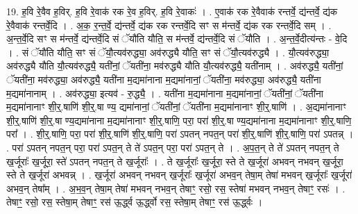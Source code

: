 \documentclass[17pt]{extarticle}
\begin{document}
19. ह॒वि रे॒वैव ह॒विर्. ह॒वि रे॒वाक॑ रक रे॒व ह॒विर्. ह॒वि रे॒वाकः॑ । . ए॒वाक॑ रक रे॒वैवाक॑ रन्तर्वे॒ द्य॑न्तर्वे॒ द्य॑क रे॒वैवाक॑ रन्तर्वे॒दि । . अ॒क॒ र॒न्त॒र्वे॒ द्य॑न्तर्वे॒ द्य॑क रक रन्तर्वे॒दि सꣳ स म॑न्तर्वे॒ द्य॑क रक रन्तर्वे॒दि सम् । . अ॒न्त॒र्वे॒दि सꣳ स म॑न्तर्वे॒ द्य॑न्तर्वे॒दि सं ॅयौ॑ति यौति॒ स म॑न्तर्वे॒ द्य॑न्तर्वे॒दि सं ॅयौ॑ति । . अ॒न्त॒र्वे॒दीत्य॑न्तः - वे॒दि । . सं ॅयौ॑ति यौति॒ सꣳ सं ॅयौ॒त्यव॑रुद्ध्या॒ अव॑रुद्ध्यै यौति॒ सꣳ सं ॅयौ॒त्यव॑रुद्ध्यै । . यौ॒त्यव॑रुद्ध्या॒ अव॑रुद्ध्यै यौति यौ॒त्यव॑रुद्ध्यै॒ यती॑नां॒ ॅयती॑ना॒ मव॑रुद्ध्यै यौति यौ॒त्यव॑रुद्ध्यै॒ यती॑नाम् । . अव॑रुद्ध्यै॒ यती॑नां॒ ॅयती॑ना॒ मव॑रुद्ध्या॒ अव॑रुद्ध्यै॒ यती॑ना म॒द्यमा॑नाना म॒द्यमा॑नानां॒ ॅयती॑ना॒ मव॑रुद्ध्या॒ अव॑रुद्ध्यै॒ यती॑ना म॒द्यमा॑नानाम् । . अव॑रुद्ध्या॒ इत्यव॑ - रु॒द्ध्यै॒ । . यती॑ना म॒द्यमा॑नाना म॒द्यमा॑नानां॒ ॅयती॑नां॒ ॅयती॑ना म॒द्यमा॑नानाꣳ शी॒र्॒.षाणि॑ शी॒र्॒.षा ण्य॒ द्यमा॑नानां॒ ॅयती॑नां॒ ॅयती॑ना म॒द्यमा॑नानाꣳ शी॒र्॒.षाणि॑ । . अ॒द्यमा॑नानाꣳ शी॒र्॒.षाणि॑ शी॒र्॒.षा ण्य॒द्यमा॑नाना म॒द्यमा॑नानाꣳ शी॒र्॒.षाणि॒ परा॒ परा॑ शी॒र्॒.षा ण्य॒द्यमा॑नाना म॒द्यमा॑नानाꣳ शी॒र्॒.षाणि॒ परा᳚ । . शी॒र्॒.षाणि॒ परा॒ परा॑ शी॒र्॒.षाणि॑ शी॒र्॒.षाणि॒ परा॑ ऽपतन् नपत॒न् परा॑ शी॒र्॒.षाणि॑ शी॒र्॒.षाणि॒ परा॑ ऽपतन्न् । . परा॑ ऽपतन् नपत॒न् परा॒ परा॑ ऽपत॒न् ते ते॑ ऽपत॒न् परा॒ परा॑ ऽपत॒न् ते । . अ॒प॒त॒न् ते ते॑ ऽपतन् नपत॒न् ते ख॒र्जूराः᳚ ख॒र्जूरा॒ स्ते॑ ऽपतन् नपत॒न् ते ख॒र्जूराः᳚ । . ते ख॒र्जूराः᳚ ख॒र्जूरा॒ स्ते ते ख॒र्जूरा॑ अभवन् नभवन् ख॒र्जूरा॒ स्ते ते ख॒र्जूरा॑ अभवन्न् । . ख॒र्जूरा॑ अभवन् नभवन् ख॒र्जूराः᳚ ख॒र्जूरा॑ अभव॒न् तेषा॒म् तेषा॑ मभवन् ख॒र्जूराः᳚ ख॒र्जूरा॑ अभव॒न् तेषा᳚म् । . अ॒भ॒व॒न् तेषा॒म् तेषा॑ मभवन् नभव॒न् तेषाꣳ॒॒ रसो॒ रस॒ स्तेषा॑ मभवन् नभव॒न् तेषाꣳ॒॒ रसः॑ । . तेषाꣳ॒॒ रसो॒ रस॒ स्तेषा॒म् तेषाꣳ॒॒ रस॑ ऊ॒र्द्ध्व ऊ॒र्द्ध्वो रस॒ स्तेषा॒म् तेषाꣳ॒॒ रस॑ ऊ॒र्द्ध्वः । \newline
\end{document}

